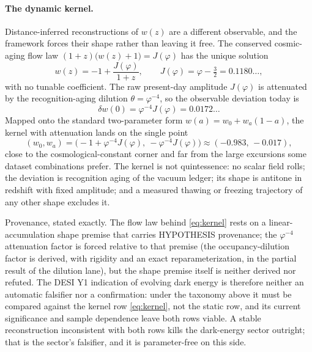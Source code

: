 \documentclass[11pt,letterpaper]{article}
\begin{document}
\paragraph{The dynamic kernel.} Distance-inferred reconstructions of $w(z)$ are a different observable, and the framework forces their shape rather than leaving it free. The conserved cosmic-aging flow law $(1+z)\bigl(w(z)+1\bigr)=J(\varphi)$ has the unique solution
\begin{equation}
w(z)=-1+\frac{J(\varphi)}{1+z},\qquad J(\varphi)=\varphi-\tfrac32=0.1180\ldots,
\label{eq:kernel}
\end{equation}
with no tunable coefficient. The raw present-day amplitude $J(\varphi)$ is attenuated by the recognition-aging dilution $\theta=\varphi^{-4}$, so the observable deviation today is
\begin{equation}
\delta w(0)=\varphi^{-4}J(\varphi)=0.0172\ldots
\label{eq:deltaw}
\end{equation}
Mapped onto the standard two-parameter form $w(a)=w_{0}+w_{a}(1-a)$, the kernel with attenuation lands on the single point
\begin{equation}
(w_{0},w_{a})=\bigl(-1+\varphi^{-4}J(\varphi),\ -\varphi^{-4}J(\varphi)\bigr)\approx(-0.983,\,-0.017),
\label{eq:cplpoint}
\end{equation}
close to the cosmological-constant corner and far from the large excursions some dataset combinations prefer. The kernel is not quintessence: no scalar field rolls; the deviation is recognition aging of the vacuum ledger; its shape is antitone in redshift with fixed amplitude; and a measured thawing or freezing trajectory of any other shape excludes it.

Provenance, stated exactly. The flow law behind \eqref{eq:kernel} rests on a linear-accumulation shape premise that carries HYPOTHESIS provenance; the $\varphi^{-4}$ attenuation factor is forced relative to that premise (the occupancy-dilution factor is derived, with rigidity and an exact reparameterization, in the partial result of the dilution lane), but the shape premise itself is neither derived nor refuted. The DESI Y1 indication of evolving dark energy \cite{DESI} is therefore neither an automatic falsifier nor a confirmation: under the taxonomy above it must be compared against the kernel row \eqref{eq:kernel}, not the static row, and its current significance and sample dependence leave both rows viable. A stable reconstruction inconsistent with both rows kills the dark-energy sector outright; that is the sector's falsifier, and it is parameter-free on this side.
\end{document}
